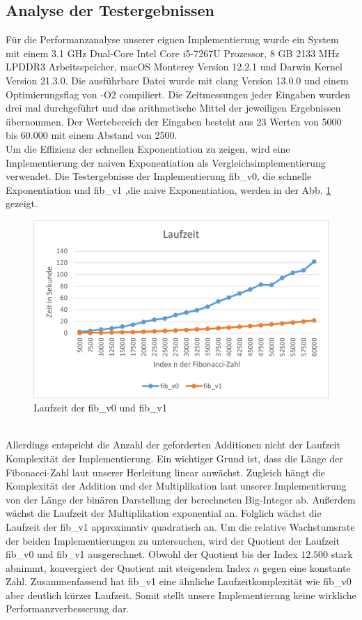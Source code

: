 \documentclass[course=erap]{aspdoc}
\begin{document}
\subsection{Analyse der Testergebnissen}
Für die Performanzanalyse unserer eignen Implementierung wurde ein System mit einem 3.1 GHz Dual-Core Intel Core i5-7267U Prozessor, 8 GB 2133 MHz LPDDR3 Arbeitsspeicher, macOS Monterey Version 12.2.1 und Darwin Kernel Version 21.3.0. Die ausführbare Datei wurde mit clang Version 13.0.0 und einem Optimierungsflag von -O2 compiliert. Die Zeitmessungen jeder Eingaben wurden drei mal durchgeführt und das arithmetische Mittel der jeweiligen Ergebnissen übernommen. Der Wertebereich der Eingaben besteht aus 23 Werten von 5000 bis 60.000 mit einem Abstand von 2500. 
\\Um die Effizienz der schnellen Exponentiation zu zeigen, wird eine Implementierung der naiven Exponentiation als Vergleichsimplementierung verwendet. Die Testergebnisse der Implementierung fib\_v0, die schnelle Exponentiation und fib\_v1 ,die naive Exponentiation, werden in der Abb. \ref{fig:laufzeit} gezeigt. 
\begin{figure}[h]
    \centering
    \includegraphics[width=0.8\linewidth]{Laufzeit.png}
    \caption{Laufzeit der fib\_v0 und fib\_v1}
    \label{fig:laufzeit}
\end{figure}
\\Allerdings entspricht die Anzahl der geforderten Additionen nicht der Laufzeit Komplexität der Implementierung. 
Ein wichtiger Grund ist, dass die Länge der Fibonacci-Zahl laut unserer Herleitung linear anwächst. Zugleich hängt die Komplexität der Addition und der Multiplikation laut unserer Implementierung von der Länge der binären Darstellung der berechneten Big-Integer ab. Außerdem wächst die Laufzeit der Multiplikation exponential an. Folglich wächst die Laufzeit der fib\_v1 approximativ quadratisch an. Um die relative Wachstumsrate der beiden Implementierungen zu untersuchen, wird der Quotient der Laufzeit fib\_v0 und fib\_v1 ausgerechnet. Obwohl der Quotient bis der Index $12.500$ stark abnimmt, konvergiert der Quotient mit steigendem Index $n$ gegen eine konstante Zahl.
Zusammenfassend hat fib\_v1 eine ähnliche Laufzeitkomplexität wie fib\_v0 aber deutlich kürzer Laufzeit. Somit stellt unsere Implementierung keine wirkliche Performanzverbesserung dar.
\end{document}
